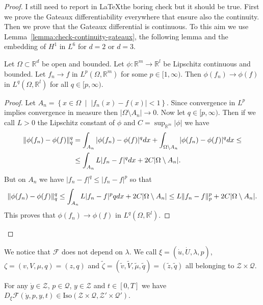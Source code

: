 \begin{proof}
I still need to report in \LaTeX the boring check but it should be true. First we prove the Gateaux differentiability everywhere that ensure also the continuity. Then we prove that the Gateaux differential is continuous. To this aim we use Lemma~\ref{lemma:check-continuity-gateaux}, the following lemma and the embedding of $H^1$ in $L^6$ for $d=2$ or $d=3$.
\begin{lemma}
\label{lemma:mensa-piovego}
Let $\Omega\subset\mathbb{R}^d$ be open and bounded. Let $\phi\colon\mathbb{R}^m\to\mathbb{R}^l$ be Lipschitz continuous and bounded. Let $f_n\to f$ in $L^p(\Omega,\mathbb{R}^m)$ for some $p\in[1,\infty)$. Then $\phi(f_n)\to \phi(f)$ in $L^q(\Omega,\mathbb{R}^l)$ for all $q\in[p,\infty)$.
\end{lemma}
\begin{proof}
Let $A_n=\left\{x\in\Omega\;\middle|\;|f_n(x)-f(x)|<1\right\}$. Since convergence in $L^p$ implies convergence in measure then $|\Omega\setminus A_n|\to0$. Now let $q\in[p,\infty)$. Then if we call $L>0$ the Lipschitz constant of $\phi$ and $C=\sup_{\mathbb{R}^m}|\phi|$ we have
\[
\begin{split}
\lVert\phi(f_n)-\phi(f)\rVert_q^q&=\int_{A_n}|\phi(f_n)-\phi(f)|^qdx+\int_{\Omega\setminus A_n}|\phi(f_n)-\phi(f)|^qdx\le\\
&\le\int_{A_n}L|f_n-f|^qdx+2C|\Omega\setminus A_n|.
\end{split}
\]
But on $A_n$ we have $|f_n-f|^q\le|f_n-f|^p$ so that
\[
\lVert\phi(f_n)-\phi(f)\rVert_q^q\le\int_{A_n}L|f_n-f|^pqdx+2C|\Omega\setminus A_n|\le L\lVert f_n-f\rVert_p^p+2C|\Omega\setminus A_n|.
\]
This proves that $\phi(f_n)\to \phi(f)$ in $L^q(\Omega,\mathbb{R}^l)$.
\end{proof}
\end{proof}
We notice that $\mathcal{F}$ does not depend on $\lambda$. We call $\xi=(\dot u,\dot U,\lambda,p)$, $\zeta=(v,V,\mu,q)=(z,q)$ and $\tilde\zeta=(\tilde v,\tilde V,\tilde\mu,\tilde q)=(\tilde z,\tilde q)$ all belonging to $\mathcal{Z}\times\mathcal{Q}$.
\begin{prop}
\label{prop:DF-iso}
For any $\dot y\in\mathscr{Z}$, $p\in\mathscr{Q}$, $y\in\mathscr{Z}$ and $t\in[0,T]$ we have $D_\xi\mathcal{F}(\dot y,p,y,t)\in\text{Iso}(\mathscr{Z}\times\mathscr{Q},\mathscr{Z}'\times\mathscr{Q}')$.
\end{prop}
